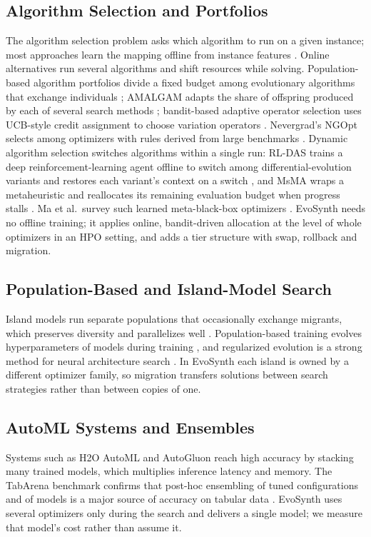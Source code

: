 \documentclass[conference]{IEEEtran}
\begin{document}
\subsection{Algorithm Selection and Portfolios}
The algorithm selection problem \cite{rice1976algorithm} asks which algorithm to run on a given instance; most approaches learn the mapping offline from instance features \cite{kerschke2019automated}. Online alternatives run several algorithms and shift resources while solving. Population-based algorithm portfolios divide a fixed budget among evolutionary algorithms that exchange individuals \cite{peng2010population}; AMALGAM adapts the share of offspring produced by each of several search methods \cite{vrugt2007improved}; bandit-based adaptive operator selection uses UCB-style credit assignment to choose variation operators \cite{fialho2010analyzing}. Nevergrad's NGOpt selects among optimizers with rules derived from large benchmarks \cite{meunier2022blackbox}. Dynamic algorithm selection switches algorithms within a single run: RL-DAS trains a deep reinforcement-learning agent offline to switch among differential-evolution variants and restores each variant's context on a switch \cite{guo2024deep}, and MsMA wraps a metaheuristic and reallocates its remaining evaluation budget when progress stalls \cite{crepinsek2025overcoming}. Ma et al.\ survey such learned meta-black-box optimizers \cite{ma2025toward}. EvoSynth needs no offline training; it applies online, bandit-driven allocation at the level of whole optimizers in an HPO setting, and adds a tier structure with swap, rollback and migration.

\subsection{Population-Based and Island-Model Search}
Island models run separate populations that occasionally exchange migrants, which preserves diversity and parallelizes well \cite{alba2002parallelism}. Population-based training evolves hyperparameters of models during training \cite{jaderberg2017population}, and regularized evolution is a strong method for neural architecture search \cite{real2019regularized, zoph2016neural}. In EvoSynth each island is owned by a different optimizer family, so migration transfers solutions between search strategies rather than between copies of one.

\subsection{AutoML Systems and Ensembles}
Systems such as H2O AutoML \cite{ledell2020h2o} and AutoGluon \cite{erickson2020autogluon} reach high accuracy by stacking many trained models, which multiplies inference latency and memory. The TabArena benchmark confirms that post-hoc ensembling of tuned configurations and of models is a major source of accuracy on tabular data \cite{erickson2025tabarena}. EvoSynth uses several optimizers only during the search and delivers a single model; we measure that model's cost rather than assume it.
\end{document}
